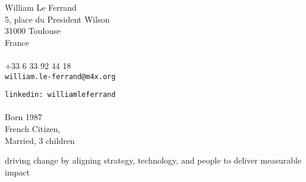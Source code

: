 \documentclass{cv}
\begin{document}
\begin{chapeau}
\begin{adresse}
	William Le Ferrand\\%
	5, place du President Wilson\\%
	31000 Toulouse\\%
        France\\%
	\ligne\\%
        +33 6 33 92 44 18\\%
	\texttt{william.le-ferrand@m4x.org}
\end{adresse}
\begin{etatcivil}
  \texttt{linkedin: williamleferrand}\\%
  \ligne\\%
  Born 1987\\
  French Citizen,\\
  Married, 3 children
\end{etatcivil}
\end{chapeau}

\vspace{4mm}
\begin{center}
driving change by aligning strategy, technology, and people to deliver measurable impact
\end{center}
\vspace{2mm}

\end{document}
